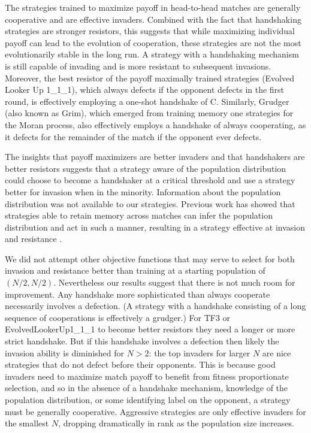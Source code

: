 \documentclass[10pt,journal]{IEEEtran}
\begin{document}
The strategies trained to maximize payoff in head-to-head matches are generally
cooperative and are effective invaders.
Combined with the fact that handshaking strategies are stronger resistors,
this suggests that while maximizing individual payoff can lead to the evolution
of cooperation, these strategies are not the most evolutionarily stable
in the long run. A strategy with a handshaking mechanism is still capable of
invading and is more resistant to subsequent invasions. Moreover, the
best resistor of the payoff maximally trained strategies (Evolved Looker Up
1\_1\_1),
which always defects if the opponent defects in the first round, is effectively
employing a one-shot handshake of C. Similarly, Grudger (also known as Grim),
which emerged from training memory one strategies for the Moran process,
also effectively employs a handshake of always cooperating, as it defects
for the remainder of the match if the opponent ever defects.

The insights that payoff maximizers are better invaders and that handshakers
are better resistors suggests that a strategy
aware of the population distribution could choose to become a handshaker at
a critical threshold and use a strategy better for invasion when in the
minority. Information about the population distribution was not available
to our strategies. Previous work has showed that strategies able to retain
memory across matches can infer the population distribution and act in such
a manner, resulting in a strategy effective at invasion and resistance
\cite{Lee2015}.

We did not attempt other objective functions that may serve to select for both
invasion and resistance better than training at a starting population of
$(N/2, N/2)$. Nevertheless our results suggest that there is not much room for
improvement. Any handshake more sophisticated than always cooperate necessarily involves
a defection. (A strategy with a handshake consisting of a long sequence of cooperations is
effectively a grudger.) For TF3 or EvolvedLookerUp1\_1\_1 to become better resistors
they need a longer or more strict handshake. But if this handshake involves
a defection then likely the invasion ability is diminished for $N > 2$: the top
invaders for larger $N$ are nice strategies that do not defect before their
opponents. This is because good invaders need to maximize match payoff to benefit
from fitness proportionate selection,
and so in the absence of a handshake mechanism, knowledge of the population
distribution, or some identifying label on the opponent,
a strategy must be generally cooperative. Aggressive strategies
are only effective invaders for the smallest $N$, dropping dramatically in rank
as the population size increases.
\end{document}
